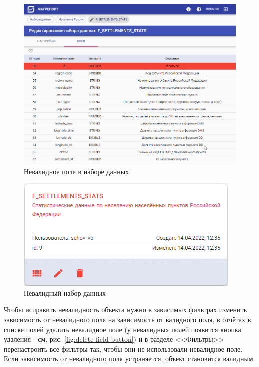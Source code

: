 \documentclass[../user-manual.tex]{subfiles}
\begin{document}
	\begin{figure}[h]
		\centering
		\includegraphics[width=\graphicswidth]{img/9-update-fields-invalid-field.png}
		\caption{Невалидное поле в наборе данных}
		\label{fig:update-fields-invalid-field}
	\end{figure}	

	\begin{figure}[h]
		\centering
		\includegraphics[width=\graphicswidth]{img/10-invalid-dataset.png}
		\caption{Невалидный набор данных}
		\label{fig:invalid-dataset}
	\end{figure}	

	Чтобы исправить невалидность объекта нужно в зависимых фильтрах изменить зависимость от невалидного поля на зависимость от валидного поля, в отчётах в списке полей удалить невалидное поле (у невалидных полей появится кнопка удаления - см. рис. \ref{fig:delete-field-button}) и в разделе <<Фильтры>> перенастроить все фильтры так, чтобы они не использовали невалидное поле. Если зависимость от невалидного поля устраняется, объект становится валидным.
\end{document}
